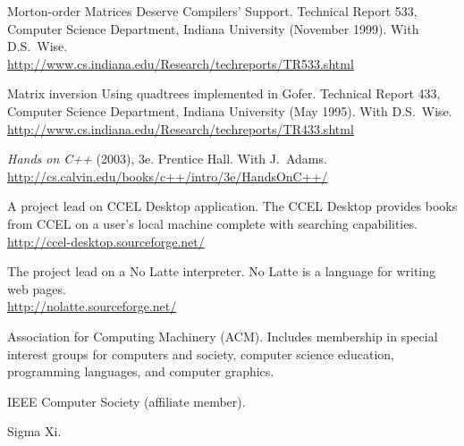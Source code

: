 \documentclass[ComputerScience]{vita}
\newcommand{\duphref}[1]{\href{#1}{#1}}
\begin{document}
\begin{vita}
\begin{Publications}
\begin{Technical Reports}
  \item Morton-order Matrices Deserve Compilers' Support. Technical Report 533, Computer Science Department, Indiana University (November 1999).  With D.S.~Wise.  \\\duphref{http://www.cs.indiana.edu/Research/techreports/TR533.shtml}

  \item Matrix inversion Using quadtrees implemented in Gofer.  Technical Report 433, Computer Science Department, Indiana University (May 1995).  With D.S.~Wise.  \\\duphref{http://www.cs.indiana.edu/Research/techreports/TR433.shtml}

  \end{Technical Reports}

  \begin{Books}

  \item \textit{Hands on C++} (2003), 3e.  Prentice Hall.  With J.\ Adams.  \\\duphref{http://cs.calvin.edu/books/c++/intro/3e/HandsOnC++/}

  \end{Books}

\end{Publications}

\newpage

\begin{software}
	\item A project lead on CCEL Desktop application.  The CCEL Desktop provides books from CCEL on a user's local machine complete with searching capabilities.  \\\duphref{http://ccel-desktop.sourceforge.net/}
	\item The project lead on a No Latte interpreter.  No Latte is a language for writing web pages.  \\\duphref{http://nolatte.sourceforge.net/}
\end{software}

\begin{Memberships}

\item Association for Computing Machinery (ACM).  Includes membership in special interest groups for computers and society, computer science education, programming languages, and computer graphics.

\item IEEE Computer Society (affiliate member).

\item Sigma Xi.


\end{Memberships}
\end{vita}
\end{document}
